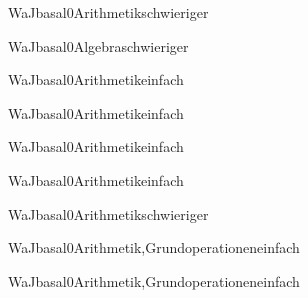 \documentclass[12pt]{article}
\begin{document}
\begin{Add}{WaJ}{basal0}{Arithmetik}{schwieriger}
\end{Add}

\begin{Add}{WaJ}{basal0}{Algebra}{schwieriger}
\end{Add}

\begin{Add}{WaJ}{basal0}{Arithmetik}{einfach}
\end{Add}

\begin{Add}{WaJ}{basal0}{Arithmetik}{einfach}
\end{Add}

\begin{Add}{WaJ}{basal0}{Arithmetik}{einfach}
\end{Add}

\begin{Add}{WaJ}{basal0}{Arithmetik}{einfach}
\end{Add}

\begin{Add}{WaJ}{basal0}{Arithmetik}{schwieriger}
\end{Add}

\begin{Add}{WaJ}{basal0}{Arithmetik,Grundoperationen}{einfach}
\end{Add}

\begin{Add}{WaJ}{basal0}{Arithmetik,Grundoperationen}{einfach}
\end{Add}
\end{document}

